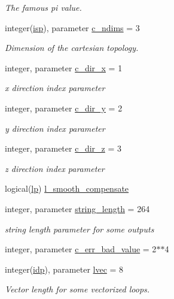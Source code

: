 \begin{DoxyCompactItemize}
\begin{DoxyCompactList}\small\item\em The famous pi value. \end{DoxyCompactList}\item 
integer(\hyperlink{namespaceconstants_a5a2ae450a00d2a29f9b70dcb776f7a2f}{isp}), parameter \hyperlink{namespaceconstants_aad8d45b739c41f2926fd2accb3de9dd2}{c\+\_\+ndims} = 3
\begin{DoxyCompactList}\small\item\em Dimension of the cartesian topology. \end{DoxyCompactList}\item 
integer, parameter \hyperlink{namespaceconstants_a8e38e74e9723ce351e7a20787e649e89}{c\+\_\+dir\+\_\+x} = 1
\begin{DoxyCompactList}\small\item\em x direction index parameter \end{DoxyCompactList}\item 
integer, parameter \hyperlink{namespaceconstants_a5d84bc6ed2e3bd7b6e64704dc587825b}{c\+\_\+dir\+\_\+y} = 2
\begin{DoxyCompactList}\small\item\em y direction index parameter \end{DoxyCompactList}\item 
integer, parameter \hyperlink{namespaceconstants_a9d2fa70332164d956c148a895e769983}{c\+\_\+dir\+\_\+z} = 3
\begin{DoxyCompactList}\small\item\em z direction index parameter \end{DoxyCompactList}\item 
logical(\hyperlink{namespaceconstants_abcbe699dae64804bc375533c0f40c6b1}{lp}) \hyperlink{namespaceconstants_a1a543c29c1b8e1fee70164d6704fbbb5}{l\+\_\+smooth\+\_\+compensate}
\item 
integer, parameter \hyperlink{namespaceconstants_a6082bfa433cfb27d3f80d0f32b278570}{string\+\_\+length} = 264
\begin{DoxyCompactList}\small\item\em string length parameter for some outputs \end{DoxyCompactList}\item 
integer, parameter \hyperlink{namespaceconstants_a0c96dab545557ad23bf55d7576f5405f}{c\+\_\+err\+\_\+bad\+\_\+value} = 2$\ast$$\ast$4
\item 
integer(\hyperlink{namespaceconstants_ae345db51770e3628e6aaf76e6a45e160}{idp}), parameter \hyperlink{namespaceconstants_a68354913203e3e01c9b0b547e9d95aae}{lvec} = 8
\begin{DoxyCompactList}\small\item\em Vector length for some vectorized loops. \end{DoxyCompactList}\end{DoxyCompactItemize}


